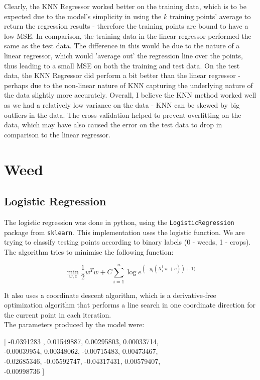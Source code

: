 \documentclass{scrartcl}
\begin{document}
Clearly, the KNN Regressor worked better on the training data, which is to be expected due to the model's simplicity in using the $k$ training points' average to return the regression results - therefore the training points are bound to have a low MSE. In comparison, the training data in the linear regressor performed the same as the test data. The difference in this would be due to the nature of a linear regressor, which would 'average out' the regression line over the points, thus leading to a small MSE on both the training and test data. On the test data, the KNN Regressor did perform a bit better than the linear regressor - perhaps due to the non-linear nature of KNN capturing the underlying nature of the data slightly more accurately. Overall, I believe the KNN method worked well as we had a relatively low variance on the data - KNN can be skewed by big outliers in the data. The cross-validation helped to prevent overfitting on the data, which may have also caused the error on the test data to drop in comparison to the linear regressor.

\newpage
\section{Weed}

\subsection{Logistic Regression}
The logistic regression was done in python, using the \texttt{LogisticRegression} package from \texttt{sklearn}. This implementation uses the logistic function. We are trying to classify testing points according to binary labels (0 - weeds, 1 - crops). The algorithm tries to minimise the following function:

\[ \min_{w, c} \frac{1} {2} w^T w + C \sum^n_{i=1} \log e ^{(-y_i(X^t_i \; w + c)) +1)} \]

It also uses a coordinate descent algorithm, which is a derivative-free optimization algorithm that performs a line search in one coordinate direction for the current point in each iteration. \cite{wiki:cd} \\

The parameters produced by the model were:

\begin{center}
[  -0.0391283 ,  0.01549887,  0.00295803,  0.00033714, \\
   -0.00039954,  0.00348062, -0.00715483,  0.00473467, \\
   -0.02685346, -0.05592747, -0.04317431,  0.00579407, \\
  -0.00998736
]
\end{center}
\end{document}
